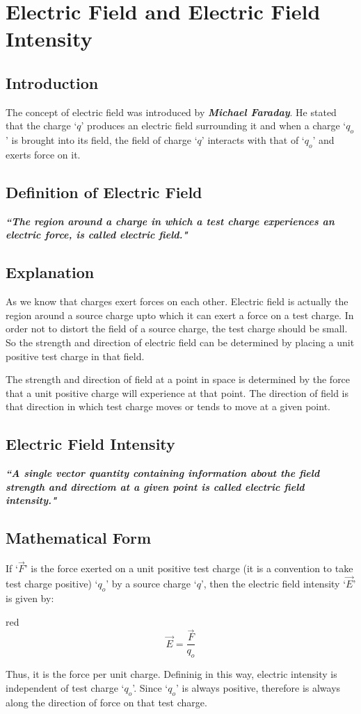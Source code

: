 \section{Electric Field and Electric Field Intensity}
\subsection*{Introduction}
The concept of electric field was introduced by \textbf{\textit{Michael Faraday}}.
He stated that the charge `$q$' produces an electric field surrounding it
and when a charge `$q_{o}$' is brought into its field,
the field of charge `$q$' interacts with that of `$q_{o}$' and exerts force on it.
\subsection*{Definition of Electric Field}
\textit{\textbf{``The region around a charge in which a test charge
experiences an electric force, is called electric field."}}
\subsection*{Explanation}
As we know that charges exert forces on each other.
Electric field is actually the region around a source charge upto
which it can exert a force on a test charge.
In order not to distort the field of a source charge,
the test charge should be small.
So the strength and direction of electric field can be determined
by placing a unit positive test charge in that field.

The strength and direction of field at a point in space is
determined by the force that a unit positive charge will
experience at that point. The direction of field is that direction
in which test charge moves or tends to move at a given point.
\subsection*{Electric Field Intensity}
\textit{\textbf{``A single vector quantity containing information about the field strength and
directiom at a given point is called electric field intensity."}}
\subsection*{Mathematical Form}
If `$\vec{F}$' is the force exerted on a unit positive test charge (it is a
convention to take test charge positive) `$q_{o}$' by a source charge `$q$',
then the electric field intensity `$\vec{E}$' is given by:
\begin{mybox}{red}{}
\begin{equation}\label{eq:11.13}
  \vec{E} = \frac{\vec{F}}{q_{o}}
\end{equation}
\end{mybox}
Thus, it is the force per unit charge.
Defininig in this way, electric intensity is independent of test charge `$q_{o}$'.
Since `$q_{o}$' is always positive, therefore is always along the direction of
force on that test charge.
